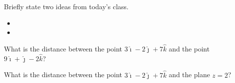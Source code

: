 \begin{problem}
\begin{subproblem}
  \end{subproblem}
\end{problem}


\postClass

\begin{problem}
\item Briefly state two ideas from today's class.
  \begin{itemize}
  \item
  \item
  \end{itemize}
\item
  \begin{subproblem}
    \item
  \end{subproblem}
\end{problem}



\begin{problem}
\item What is the distance between the point $3\hat{\imath}-2\hat{\jmath}+7\hat{k}$ and the point $9\hat{\imath}+\hat{\jmath}-2\hat{k}$?
  \vfill
\item What is the distance between the point $3\hat{\imath}-2\hat{\jmath}+7\hat{k}$ and the plane $z=2$?
  \vfill
\end{problem}


